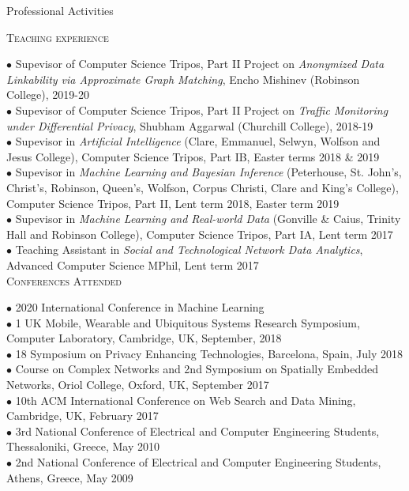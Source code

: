 \documentclass[11pt]{resume}
\begin{document}
\begin{category}{Professional Activities} 

\citemnobullet 
\textsc{Teaching experience}

{$\bullet$  Supevisor of Computer Science Tripos, Part II Project on \emph{Anonymized Data Linkability via Approximate Graph Matching}, Encho Mishinev (Robinson College), 2019-20}\\
{$\bullet$  Supevisor of Computer Science Tripos, Part II Project on \emph{Traffic Monitoring under Differential Privacy}, Shubham Aggarwal (Churchill College), 2018-19}\\
{$\bullet$  Supevisor in \emph{Artificial Intelligence} (Clare, Emmanuel, Selwyn, Wolfson and Jesus College), Computer Science Tripos, Part IB, Easter terms 2018 \& 2019}\\
{$\bullet$  Supevisor in \emph{Machine Learning and Bayesian Inference} (Peterhouse, St. John's, Christ's, Robinson, Queen's, Wolfson, Corpus Christi, Clare and King's College), Computer Science Tripos, Part II, Lent term 2018, Easter term 2019}\\
{$\bullet$  Supevisor in \emph{Machine Learning and Real-world Data} (Gonville \& Caius, Trinity Hall and Robinson College), Computer Science Tripos, Part IA, Lent term 2017}\\
{$\bullet$ Teaching Assistant in \emph{Social and Technological Network Data Analytics}, Advanced Computer Science MPhil, Lent term 2017}\\


\citemnobullet 
\textsc{Conferences Attended}

$\bullet$ 2020 International Conference in Machine Learning\\
$\bullet$ 1 UK Mobile, Wearable and Ubiquitous Systems Research Symposium, Computer Laboratory, Cambridge, UK, September, 2018\\
$\bullet$ 18 Symposium on Privacy Enhancing Technologies, Barcelona, Spain, July 2018\\
$\bullet$ Course on Complex Networks and 2nd Symposium on Spatially Embedded Networks,  Oriol College, Oxford, UK, September 2017\\
$\bullet$ 10th ACM International Conference on Web Search and Data Mining, Cambridge, UK, February 2017\\
$\bullet$ 3rd National Conference of Electrical and Computer Engineering Students, Thessaloniki, Greece, May 2010\\
$\bullet$ 2nd National Conference of Electrical and Computer Engineering Students, Athens, Greece, May 2009 \\


\end{category}
\end{document}
